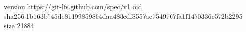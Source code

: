 version https://git-lfs.github.com/spec/v1
oid sha256:1b163b745de81199859804daa483cdf8557ac7549767fa1f1470336c572b2295
size 21884
